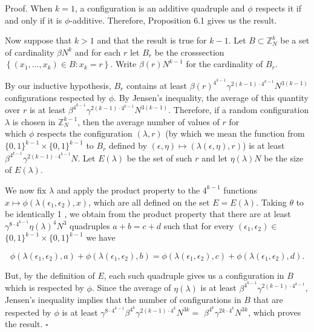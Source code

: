 \documentclass[10pt]{article}
\begin{document}
Proof. When $k=1$, a configuration is an additive quadruple and $\phi$ respects it if and only if it is $\phi$-additive. Therefore, Proposition 6.1 gives us the result.

Now suppose that $k>1$ and that the result is true for $k-1$. Let $B \subset \mathbb{Z}_{N}^{k}$ be a set of cardinality $\beta N^{k}$ and for each $r$ let $B_{r}$ be the crosssection $\left\{\left(x_{1}, \ldots, x_{k}\right) \in B: x_{k}=r\right\}$. Write $\beta(r) N^{k-1}$ for the cardinality of $B_{r}$.

By our inductive hypothesis, $B_{r}$ contains at least $\beta(r)^{4^{k-1}} \gamma^{2(k-1) \cdot 4^{k-1}} N^{3(k-1)}$ configurations respected by $\phi$. By Jensen's inequality, the average of this quantity over $r$ is at least $\beta^{4^{k-1}} \gamma^{2(k-1) \cdot 4^{k-1}} N^{3(k-1)}$. Therefore, if a random configuration $\lambda$ is chosen in $\mathbb{Z}_{N}^{k-1}$, then the average number of values of $r$ for\\
which $\phi$ respects the configuration $(\lambda, r)$ (by which we mean the function from $\{0,1\}^{k-1}\times\{0,1\}^{k-1}$ to $B_{r}$ defined by $(\epsilon,\eta) \mapsto(\lambda(\epsilon,\eta), r)$) is at least $\beta^{4^{k-1}} \gamma^{2(k-1) \cdot 4^{k-1}} N$. Let $E(\lambda)$ be the set of such $r$ and let $\eta(\lambda) N$ be the size of $E(\lambda)$.

We now fix $\lambda$ and apply the product property to the $4^{k-1}$ functions $x \mapsto \phi\left(\lambda\left(\epsilon_{1}, \epsilon_{2}\right), x\right)$, which are all defined on the set $E=E(\lambda)$. Taking $\theta$ to be identically 1 , we obtain from the product property that there are at least $\gamma^{8\cdot4^{k-1}} \eta(\lambda)^{4} N^{3}$ quadruples $a+b=c+d$ such that for every $\left(\epsilon_{1}, \epsilon_{2}\right) \in$ $\{0,1\}^{k-1} \times\{0,1\}^{k-1}$ we have

$$
\phi\left(\lambda\left(\epsilon_{1}, \epsilon_{2}\right), a\right)+\phi\left(\lambda\left(\epsilon_{1}, \epsilon_{2}\right), b\right)=\phi\left(\lambda\left(\epsilon_{1}, \epsilon_{2}\right), c\right)+\phi\left(\lambda\left(\epsilon_{1}, \epsilon_{2}\right), d\right) .
$$

But, by the definition of $E$, each such quadruple gives us a configuration in $B$ which is respected by $\phi$. Since the average of $\eta(\lambda)$ is at least $\beta^{4^{k-1}} \gamma^{2(k-1) \cdot 4^{k-1}}$, Jensen's inequality implies that the number of configurations in $B$ that are respected by $\phi$ is at least $\gamma^{8\cdot4^{k-1}} \beta^{4^{k}} \gamma^{2(k-1) \cdot 4^{k}} N^{3 k}=$ $\beta^{4^{k}} \gamma^{2 k \cdot 4^{k}} N^{3 k}$, which proves the result. \(\square\)
\end{document}
